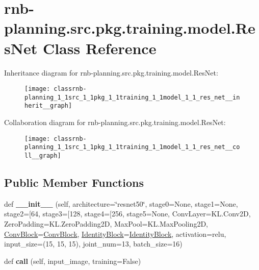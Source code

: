 \hypertarget{classrnb-planning_1_1src_1_1pkg_1_1training_1_1model_1_1_res_net}{}\section{rnb-\/planning.src.\+pkg.\+training.\+model.\+Res\+Net Class Reference}
\label{classrnb-planning_1_1src_1_1pkg_1_1training_1_1model_1_1_res_net}


Inheritance diagram for rnb-\/planning.src.\+pkg.\+training.\+model.\+Res\+Net\+:\nopagebreak
\begin{figure}[H]
\begin{center}
\leavevmode
\texttt{[image: classrnb-planning\_1\_1src\_1\_1pkg\_1\_1training\_1\_1model\_1\_1\_res\_net\_\_inherit\_\_graph]}
\end{center}
\end{figure}


Collaboration diagram for rnb-\/planning.src.\+pkg.\+training.\+model.\+Res\+Net\+:\nopagebreak
\begin{figure}[H]
\begin{center}
\leavevmode
\texttt{[image: classrnb-planning\_1\_1src\_1\_1pkg\_1\_1training\_1\_1model\_1\_1\_res\_net\_\_coll\_\_graph]}
\end{center}
\end{figure}
\subsection*{Public Member Functions}
\begin{DoxyCompactItemize}
\item 
\mbox{\label{classrnb-planning_1_1src_1_1pkg_1_1training_1_1model_1_1_res_net_ab44058646b114a445882de74cda17570}} 
def {\bfseries \+\_\+\+\_\+init\+\_\+\+\_\+} (self, architecture=\char`\"{}resnet50\char`\"{}, stage0=None, stage1=None, stage2=\mbox{[}64, stage3=\mbox{[}128, stage4=\mbox{[}256, stage5=None, Conv\+Layer=K\+L.\+Conv2D, Zero\+Padding=K\+L.\+Zero\+Padding2D, Max\+Pool=K\+L.\+Max\+Pooling2D, \hyperlink{classrnb-planning_1_1src_1_1pkg_1_1training_1_1model_1_1_conv_block}{Conv\+Block}=\hyperlink{classrnb-planning_1_1src_1_1pkg_1_1training_1_1model_1_1_conv_block}{Conv\+Block}, \hyperlink{classrnb-planning_1_1src_1_1pkg_1_1training_1_1model_1_1_identity_block}{Identity\+Block}=\hyperlink{classrnb-planning_1_1src_1_1pkg_1_1training_1_1model_1_1_identity_block}{Identity\+Block}, activation=\textquotesingle{}relu\textquotesingle{}, input\+\_\+size=(15, 15, 15), joint\+\_\+num=13, batch\+\_\+size=16)
\item 
\mbox{\label{classrnb-planning_1_1src_1_1pkg_1_1training_1_1model_1_1_res_net_a922cf8753ea6f756ecb1de684852d84e}} 
def {\bfseries call} (self, input\+\_\+image, training=False)
\end{DoxyCompactItemize}
